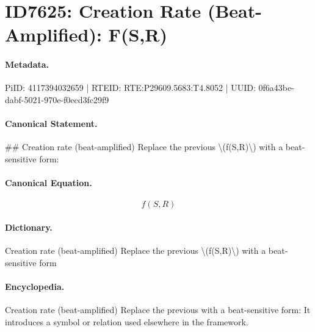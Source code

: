 \section*{ID7625: Creation Rate (Beat-Amplified): F(S,R)}
\paragraph{Metadata.}
PiID: 4117394032659 | RTEID: RTE:P29609.5683:T4.8052 | UUID: 0f6a43be-dabf-5021-970e-f0ecd3fc29f9

\paragraph{Canonical Statement.}
\#\# Creation rate (beat-amplified) Replace the previous \textbackslash{}(f(S,R)\textbackslash{}) with a beat-sensitive form:

\paragraph{Canonical Equation.}
\[
f(S,R)
\]

\paragraph{Dictionary.}
Creation rate (beat-amplified) Replace the previous \textbackslash{}(f(S,R)\textbackslash{}) with a beat-sensitive form

\paragraph{Encyclopedia.}
Creation rate (beat-amplified) Replace the previous with a beat-sensitive form: It introduces a symbol or relation used elsewhere in the framework.
